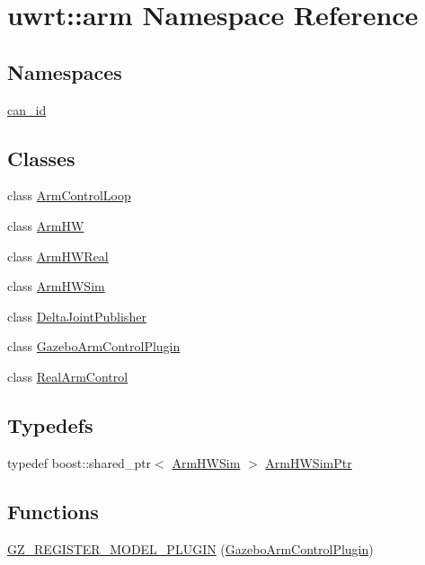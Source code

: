 \hypertarget{namespaceuwrt_1_1arm}{}\section{uwrt\+:\+:arm Namespace Reference}
\label{namespaceuwrt_1_1arm}
\subsection*{Namespaces}
\begin{DoxyCompactItemize}
\item 
 \hyperlink{namespaceuwrt_1_1arm_1_1can__id}{can\+\_\+id}
\end{DoxyCompactItemize}
\subsection*{Classes}
\begin{DoxyCompactItemize}
\item 
class \hyperlink{classuwrt_1_1arm_1_1_arm_control_loop}{Arm\+Control\+Loop}
\item 
class \hyperlink{classuwrt_1_1arm_1_1_arm_h_w}{Arm\+HW}
\item 
class \hyperlink{classuwrt_1_1arm_1_1_arm_h_w_real}{Arm\+H\+W\+Real}
\item 
class \hyperlink{classuwrt_1_1arm_1_1_arm_h_w_sim}{Arm\+H\+W\+Sim}
\item 
class \hyperlink{classuwrt_1_1arm_1_1_delta_joint_publisher}{Delta\+Joint\+Publisher}
\item 
class \hyperlink{classuwrt_1_1arm_1_1_gazebo_arm_control_plugin}{Gazebo\+Arm\+Control\+Plugin}
\item 
class \hyperlink{classuwrt_1_1arm_1_1_real_arm_control}{Real\+Arm\+Control}
\end{DoxyCompactItemize}
\subsection*{Typedefs}
\begin{DoxyCompactItemize}
\item 
typedef boost\+::shared\+\_\+ptr$<$ \hyperlink{classuwrt_1_1arm_1_1_arm_h_w_sim}{Arm\+H\+W\+Sim} $>$ \hyperlink{namespaceuwrt_1_1arm_a74b3a52f0f9eae5e40d20a1a07334eb8}{Arm\+H\+W\+Sim\+Ptr}
\end{DoxyCompactItemize}
\subsection*{Functions}
\begin{DoxyCompactItemize}
\item 
\hyperlink{namespaceuwrt_1_1arm_a1cd9b55d4936d61e403fc111a9f444c2}{G\+Z\+\_\+\+R\+E\+G\+I\+S\+T\+E\+R\+\_\+\+M\+O\+D\+E\+L\+\_\+\+P\+L\+U\+G\+IN} (\hyperlink{classuwrt_1_1arm_1_1_gazebo_arm_control_plugin}{Gazebo\+Arm\+Control\+Plugin})
\end{DoxyCompactItemize}
